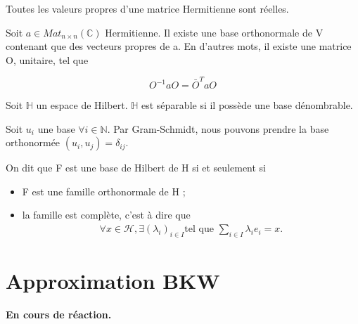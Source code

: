 \documentclass[../notesdecours.tex]{subfiles}
\begin{document}
\begin{lemma} Toutes les valeurs propres d'une matrice Hermitienne sont réelles. \end{lemma}


\begin{theorem} Soit $a \in Mat_{n \times n} (\mathbb{C})$ Hermitienne. Il existe une base orthonormale de V contenant que des vecteurs propres de a. En d'autres mots, il existe une matrice O, unitaire, tel que

\begin{equation}
O^{-1}aO = \bar{O}^TaO
\end{equation}
\end{theorem}

\begin{definition}
Soit $\mathbb{H}$ un espace de Hilbert. $\mathbb{H}$ est séparable si il possède une base dénombrable. 
\end{definition}

\begin{remark}
Soit $u_i$ une base $\forall i\in\mathbb{N}$. Par Gram-Schmidt, nous pouvons prendre la base orthonormée $(u_i,u_j) = \delta_{ij}$.
\end{remark}

\begin{definition}
	On dit que F est une base de Hilbert de H si et seulement si
	\begin{itemize}
		\item F est une famille orthonormale de H ;
		\item la famille est complète, c'est à dire que \begin{align}
			\forall x\in\mathcal{H}, \exists \left(\lambda_i\right)_{i\in I} \text{tel que } \sum_{i\in I} \lambda_ie_i = x.
		\end{align}
	\end{itemize}
\end{definition}


\section{Approximation BKW}

\color{blue} \textbf{En cours de réaction.} \color{black}

\end{document}
